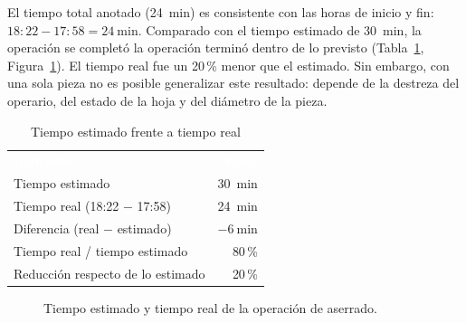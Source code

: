 \documentclass[12pt,a4paper]{article}
\newcommand{\encab}[1]{\textcolor{white}{\sffamily\bfseries #1}}
\begin{document}
El tiempo total anotado (\SI{24}{\minute}) es consistente con las horas de
inicio y fin: $18{:}22 - 17{:}58 = \SI{24}{\minute}$. Comparado con el tiempo
estimado de \SI{30}{\minute}, la operación se completó la operación terminó
dentro de lo previsto (Tabla~\ref{tab:tiempos}, Figura~\ref{fig:tiempos}).
El tiempo real fue un 20\,\% menor que el estimado. Sin embargo, con una sola
pieza no es posible generalizar este resultado: depende de la destreza del
operario, del estado de la hoja y del diámetro de la pieza.

\begin{table}[!htb]
	\centering
	\caption{Tiempo estimado frente a tiempo real}\label{tab:tiempos}
	\small
	\begin{tabular}{l r}
		\rowcolor{darkblue}
		\encab{Indicador}                 & \encab{Valor}      \\
		Tiempo estimado                   & \SI{30}{\minute}   \\
		Tiempo real (18:22 $-$ 17:58)     & \SI{24}{\minute}   \\
		Diferencia (real $-$ estimado)    & $-\SI{6}{\minute}$ \\
		Tiempo real / tiempo estimado     & 80\,\%             \\
		Reducción respecto de lo estimado & 20\,\%             \\
	\end{tabular}
\end{table}

\begin{figure}[H]
	\centering
	\caption{Tiempo estimado y tiempo real de la operación de
		aserrado.}\label{fig:tiempos}
\end{figure}

\end{document}
